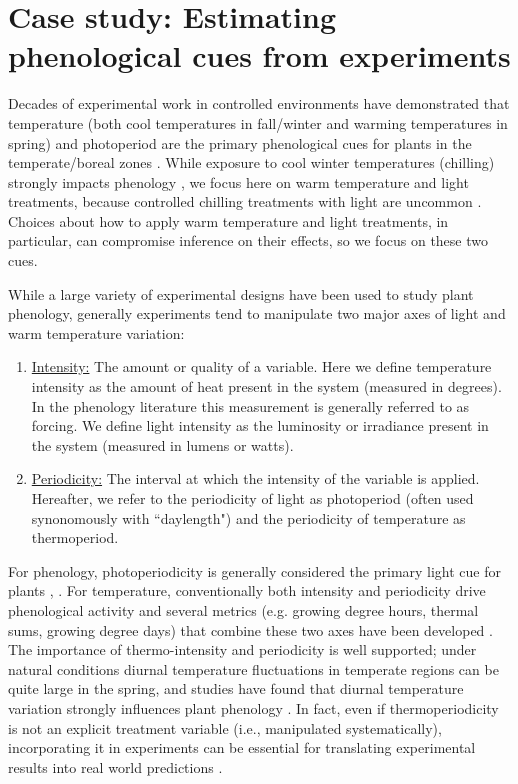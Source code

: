 \documentclass[11pt]{article}
\begin{document}
\section*{Case study: Estimating phenological cues from experiments}
Decades of experimental work in controlled environments have demonstrated that temperature (both cool temperatures in fall/winter and warming temperatures in spring) and photoperiod are the primary phenological cues for plants in the temperate/boreal zones \citep{Ettinger:2020aa}. While exposure to cool winter temperatures (chilling) strongly impacts phenology \citep{Laube2014}, we focus here on warm temperature and light treatments, because controlled chilling treatments with light are uncommon \citep{Wolkovich_2022}. Choices about how to apply warm temperature and light treatments, in particular, can compromise inference on their effects, so we focus on these two cues.

While a large variety of experimental designs have been used to study plant phenology, generally experiments tend to manipulate two major axes of light and warm temperature variation:
\begin{enumerate}
\item \underline{Intensity:} The amount or quality of a variable. Here we define temperature intensity as the amount of heat present in the system (measured in degrees). In the phenology literature this measurement is generally referred to as forcing. We define light intensity as the luminosity or irradiance present in the system (measured in lumens or watts). 
\item \underline{Periodicity:} The interval at which the intensity of the variable is applied. Hereafter, we refer to the periodicity of light as photoperiod (often used synonomously with ``daylength") and the periodicity of temperature as thermoperiod. 
\end{enumerate}
For phenology, photoperiodicity is generally considered the primary light cue for plants \citep{WAY:2015aa}, \citep[though regarding light intensity and phenology see][]{Brelsford2018,Cober1996}. For temperature, conventionally both intensity and periodicity drive phenological activity and several metrics (e.g. growing degree hours, thermal sums, growing degree days)  that combine these two axes have been developed \citep{Gu:2016wa}. The importance of thermo-intensity and periodicity is well supported; under natural conditions diurnal temperature fluctuations in temperate regions can be quite large in the spring, and studies have found that diurnal temperature variation strongly influences plant phenology \citep{Burghardt:2016uy}. In fact, even if thermoperiodicity is not an explicit treatment variable (i.e., manipulated systematically), incorporating it in experiments can be essential for translating experimental results into real world predictions \citep{plants9101312}.
\end{document}
